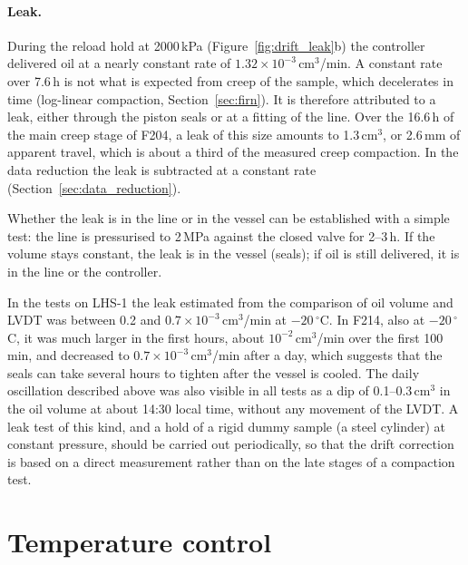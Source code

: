 \paragraph{Leak.} During the reload hold at 2000\,kPa (Figure~\ref{fig:drift_leak}b) the controller delivered oil at a nearly constant rate of $1.32\times10^{-3}$\,cm$^3$/min. A constant rate over 7.6\,h is not what is expected from creep of the sample, which decelerates in time (log-linear compaction, Section~\ref{sec:firn}). It is therefore attributed to a leak, either through the piston seals or at a fitting of the line. Over the 16.6\,h of the main creep stage of F204, a leak of this size amounts to 1.3\,cm$^3$, or 2.6\,mm of apparent travel, which is about a third of the measured creep compaction. In the data reduction the leak is subtracted at a constant rate (Section~\ref{sec:data_reduction}).

Whether the leak is in the line or in the vessel can be established with a simple test: the line is pressurised to 2\,MPa against the closed valve for 2--3\,h. If the volume stays constant, the leak is in the vessel (seals); if oil is still delivered, it is in the line or the controller.

In the tests on LHS-1 the leak estimated from the comparison of oil volume and LVDT was between 0.2 and $0.7\times10^{-3}$\,cm$^3$/min at $-20\,^\circ$C. In F214, also at $-20\,^\circ$C, it was much larger in the first hours, about $10^{-2}$\,cm$^3$/min over the first 100\,min, and decreased to $0.7\times10^{-3}$\,cm$^3$/min after a day, which suggests that the seals can take several hours to tighten after the vessel is cooled. The daily oscillation described above was also visible in all tests as a dip of 0.1--0.3\,cm$^3$ in the oil volume at about 14:30 local time, without any movement of the LVDT.
A leak test of this kind, and a hold of a rigid dummy sample (a steel cylinder) at constant pressure, should be carried out periodically, so that the drift correction is based on a direct measurement rather than on the late stages of a compaction test.

\section{Temperature control}
\label{sec:temperature_events}

